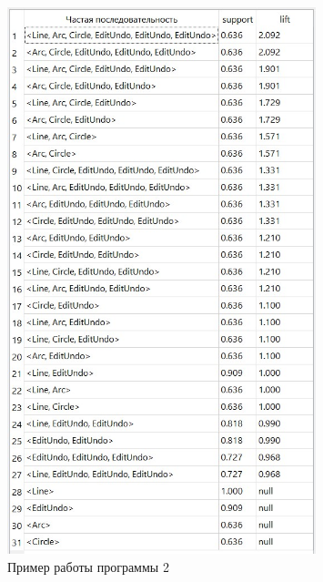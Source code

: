 \begin{figure}[h!]
	\centering
	\includegraphics[width=0.8\textwidth]{inc/img/example2.jpg}
	\caption{Пример работы программы 2}
	\label{example2}
\end{figure}
